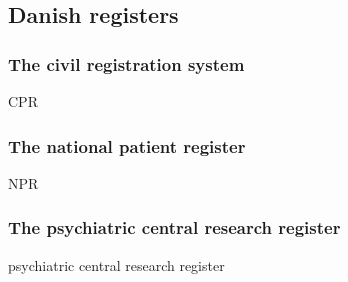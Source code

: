 
\subsection{Danish registers}


\subsubsection{The civil registration system}

CPR \cite{pedersen2011danish}

\subsubsection{The national patient register}

NPR \cite{lynge2011danish}


\subsubsection{The psychiatric central research register}

psychiatric central research register \cite{mors2011danish}




